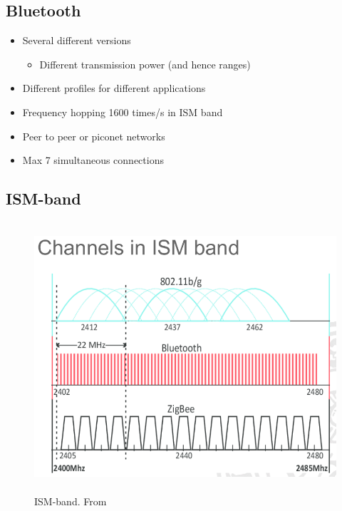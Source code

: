 \subsection{Bluetooth}
 \begin{itemize}
\item Several different versions
  \begin{itemize}
    \item Different transmission power (and hence ranges)
  \end{itemize}
\item Different profiles for different applications
\item Frequency hopping 1600 times/s in ISM band
\item Peer to peer or piconet networks
\item Max 7 simultaneous connections
\end{itemize}

\subsection{ISM-band}
\begin{figure}[h]
    \vspace{10mm}
    \centering
    \includegraphics[width=12cm, height=10cm]{image/ISM-band.png}
    \caption{ISM-band. From \cite{}}
\end{figure}


